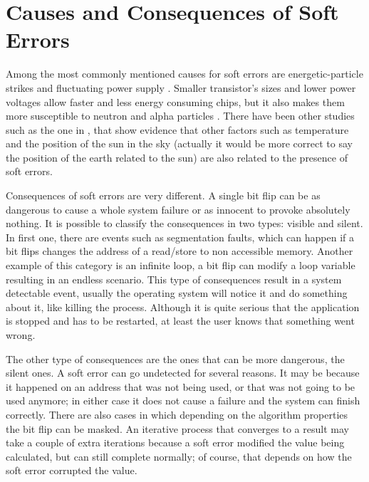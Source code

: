 \section{Causes and Consequences of Soft Errors}
\label{sec:CausesAndConsequencesSoftErrors}
Among the most commonly mentioned causes for soft errors are energetic-particle strikes and fluctuating power supply \cite{kuvaiskii2016haft} \cite{reis2005swift} \cite{zhang2012daft}. Smaller transistor's sizes and lower power voltages allow faster and less energy consuming chips, but it also makes them more susceptible to neutron and alpha particles \cite{constantinescu2003trends}. There have been other studies such as the one in \cite{bautista2016unprotected}, that show evidence that other factors such as temperature and the position of the sun in the sky (actually it would be more correct to say the position of the earth related to the sun) are also related to the presence of soft errors. 

Consequences of soft errors are very different. A single bit flip can be as dangerous to cause a whole system failure or as innocent to provoke absolutely nothing. It is possible to classify the consequences in two types: visible and silent. In first one, there are events such as segmentation faults, which can happen if a bit flips changes the address of a read/store to non accessible memory. Another example of this category is an infinite loop, a bit flip can modify a loop variable resulting in an endless scenario. This type of consequences result in a system detectable event, usually the operating system will notice it and do something about it, like killing the process. Although it is quite serious that the application is stopped and has to be restarted, at least the user knows that something went wrong. 

The other type of consequences are the ones that can be more dangerous, the silent ones. A soft error can go undetected for several reasons. It may be because it happened on an address that was not being used, or that was not going to be used anymore; in either case it does not cause a failure and the system can finish correctly. There are also cases in which depending on the algorithm properties the bit flip can be masked. An iterative process that converges to a result may take a couple of extra iterations because a soft error modified the value being calculated, but can still complete normally; of course, that depends on how the soft error corrupted the value.

